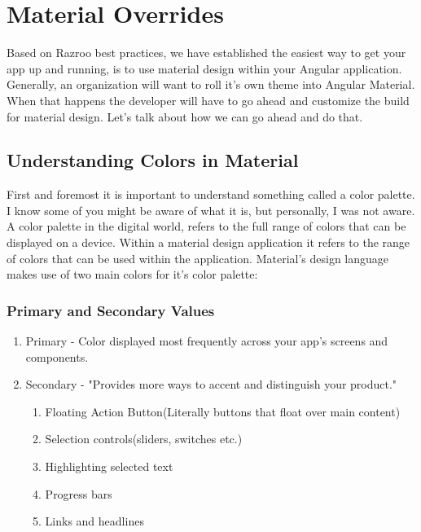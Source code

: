 \maketitle{}
\section{ Material Overrides }

Based on Razroo best practices, we have established the easiest way to get 
your app up and running, is to use material design within your Angular 
application. Generally, an organization will want to roll it's own theme into 
Angular Material. When that happens the developer will have to go ahead and 
customize the build for material design. Let's talk about how we can go ahead 
and do that. 

\subsection{Understanding Colors in Material}
First and foremost it is important to understand something called a color 
palette. I know some of you might be aware of what it is, but personally, I was
not aware. A color palette in the digital world, refers to the full range of 
colors that can be displayed on a device. Within a material design application 
it refers to the range of colors that can be used within the application. 
Material's design language makes use of two main colors for it's color palette: 

\subsubsection{Primary and Secondary Values}
\begin{enumerate}
  \item Primary - Color displayed most frequently across your app's screens and
  components. 
  \item Secondary - "Provides more ways to accent and distinguish your product."
  \begin{enumerate}
    \item Floating Action Button(Literally buttons that float over main content)
    \item Selection controls(sliders, switches etc.)
    \item Highlighting selected text
    \item Progress bars
    \item Links and headlines
  \end{enumerate}
\end{enumerate}

